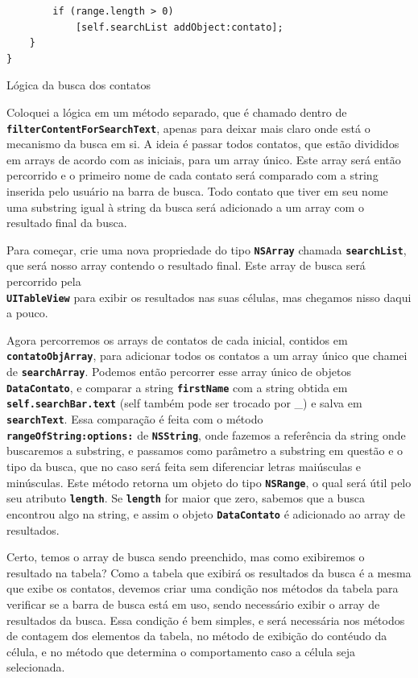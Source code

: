 \documentclass[a4paper,12pt,brazil,doubleside]{book}
\begin{document}
\begin{singlespace}
\begin{listing}[H]
\begin{verbatim}
        if (range.length > 0)
            [self.searchList addObject:contato];
    }
}
\end{verbatim}
\caption{Lógica da busca dos contatos}
\end{listing}


Coloquei a lógica em um método separado, que é chamado dentro de\\
\texttt{\textbf{filterContentForSearchText}}, apenas para deixar mais claro onde está o mecanismo da busca em si. A ideia é passar todos contatos, que estão divididos em arrays de acordo com as iniciais, para um array único. Este array será então percorrido e o primeiro nome de cada contato será comparado com a string inserida pelo usuário na barra de busca. Todo contato que tiver em seu nome uma substring igual à string da busca será adicionado a um array com o resultado final da busca.

Para começar, crie uma nova propriedade do tipo \texttt{\textbf{NSArray}} chamada \texttt{\textbf{searchList}}, que será nosso array contendo o resultado final. Este array de busca será percorrido pela\\
\texttt{\textbf{UITableView}} para exibir os resultados nas suas células, mas chegamos nisso daqui a pouco.

Agora percorremos os arrays de contatos de cada inicial, contidos em \texttt{\textbf{contatoObjArray}}, para adicionar todos os contatos a um array único que chamei de \texttt{\textbf{searchArray}}. Podemos então percorrer esse array único de objetos \texttt{\textbf{DataContato}}, e comparar a string \texttt{\textbf{firstName}} com a string obtida em \texttt{\textbf{self.searchBar.text}} (self também pode ser trocado por \_) e salva em \texttt{\textbf{searchText}}. Essa comparação é feita com o método\\
\texttt{\textbf{rangeOfString:options:}} de \texttt{\textbf{NSString}}, onde fazemos a referência da string onde buscaremos a substring, e passamos como parâmetro a substring em questão e o tipo da busca, que no caso será feita sem diferenciar letras maiúsculas e minúsculas. Este método retorna um objeto do tipo \texttt{\textbf{NSRange}}, o qual será útil pelo seu atributo \texttt{\textbf{length}}. Se \texttt{\textbf{length}} for maior que zero, sabemos que a busca encontrou algo na string, e assim o objeto \texttt{\textbf{DataContato}} é adicionado ao array de resultados.

Certo, temos o array de busca sendo preenchido, mas como exibiremos o resultado na tabela? Como a tabela que exibirá os resultados da busca é a mesma que exibe os contatos, devemos criar uma condição nos métodos da tabela para verificar se a barra de busca está em uso, sendo necessário exibir o array de resultados da busca. Essa condição é bem simples, e será necessária nos métodos de contagem dos elementos da tabela, no método de exibição do contéudo da célula, e no método que determina o comportamento caso a célula seja selecionada.


\end{singlespace}
\end{document}
